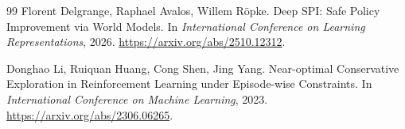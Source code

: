 \begin{thebibliography}{99}
Florent Delgrange, Raphael Avalos, Willem R{\"o}pke.
Deep SPI: Safe Policy Improvement via World Models.
In \emph{International Conference on Learning Representations}, 2026.
\url{https://arxiv.org/abs/2510.12312}.

Donghao Li, Ruiquan Huang, Cong Shen, Jing Yang.
Near-optimal Conservative Exploration in Reinforcement Learning under Episode-wise Constraints.
In \emph{International Conference on Machine Learning}, 2023.
\url{https://arxiv.org/abs/2306.06265}.

\end{thebibliography}
